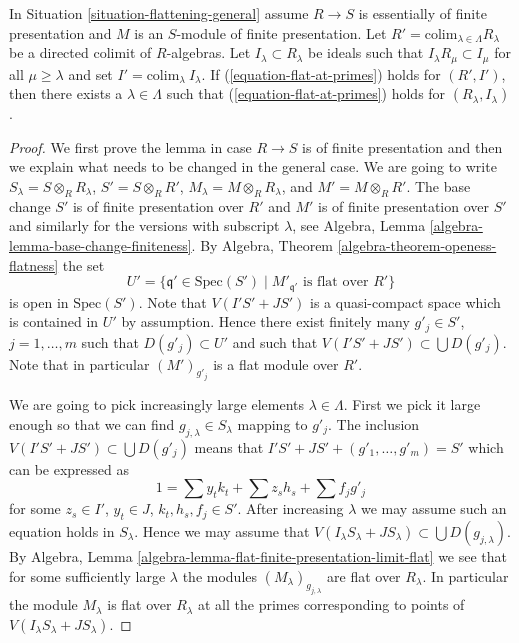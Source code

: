 \begin{lemma}
\label{lemma-limit-preserving-flat-at-primes}
In Situation \ref{situation-flattening-general}
assume $R \to S$ is essentially of finite presentation
and $M$ is an $S$-module of finite presentation. Let
$R' = \text{colim}_{\lambda \in \Lambda} R_\lambda$
be a directed colimit of $R$-algebras. Let $I_\lambda \subset R_\lambda$
be ideals such that $I_\lambda R_\mu \subset I_\mu$ for all
$\mu \geq \lambda$ and set $I' = \text{colim}_\lambda\ I_\lambda$.
If (\ref{equation-flat-at-primes}) holds for
$(R', I')$, then there exists a $\lambda \in \Lambda$ such that
(\ref{equation-flat-at-primes}) holds for $(R_\lambda, I_\lambda)$.
\end{lemma}

\begin{proof}
We first prove the lemma in case $R \to S$ is of finite presentation
and then we explain what needs to be changed in the general case.
We are going to write $S_\lambda = S \otimes_R R_\lambda$,
$S' = S \otimes_R R'$, $M_\lambda = M \otimes_R R_\lambda$, and
$M' = M \otimes_R R'$.
The base change $S'$ is of finite presentation over $R'$ and
$M'$ is of finite presentation over $S'$ and similarly for the
versions with subscript $\lambda$, see
Algebra, Lemma \ref{algebra-lemma-base-change-finiteness}.
By
Algebra, Theorem \ref{algebra-theorem-openess-flatness}
the set
$$
U' = \{\mathfrak q' \in \text{Spec}(S') \mid
M'_{\mathfrak q'}\text{ is flat over }R'\}
$$
is open in $\text{Spec}(S')$. Note that $V(I'S' + JS')$
is a quasi-compact space which is contained in $U'$ by assumption.
Hence there exist finitely many $g'_j \in S'$, $j = 1, \ldots, m$
such that $D(g'_j) \subset U'$ and such
that $V(I'S' + JS') \subset \bigcup D(g'_j)$.
Note that in particular $(M')_{g'_j}$ is a flat module over $R'$.

\medskip\noindent
We are going to pick increasingly large elements $\lambda \in \Lambda$.
First we pick it large enough so that we can find
$g_{j, \lambda} \in S_{\lambda}$ mapping to $g'_j$.
The inclusion $V(I'S' + JS') \subset \bigcup D(g'_j)$ means that
$I'S' + JS' + (g'_1, \ldots, g'_m) = S'$ which can be expressed as
$$
1 = \sum y_tk_t + \sum z_sh_s + \sum f_jg'_j
$$
for some $z_s \in I'$, $y_t \in J$, $k_t, h_s, f_j \in S'$.
After increasing $\lambda$ we may assume such an equation holds in
$S_\lambda$. Hence we may assume that
$V(I_\lambda S_\lambda + J S_\lambda) \subset \bigcup D(g_{j, \lambda})$. By
Algebra, Lemma \ref{algebra-lemma-flat-finite-presentation-limit-flat}
we see that for some sufficiently large $\lambda$ the modules
$(M_\lambda)_{g_{j, \lambda}}$ are flat over $R_\lambda$.
In particular the module $M_\lambda$ is flat over $R_\lambda$
at all the primes corresponding to points of
$V(I_\lambda S_\lambda + J S_\lambda)$.


\end{proof}
